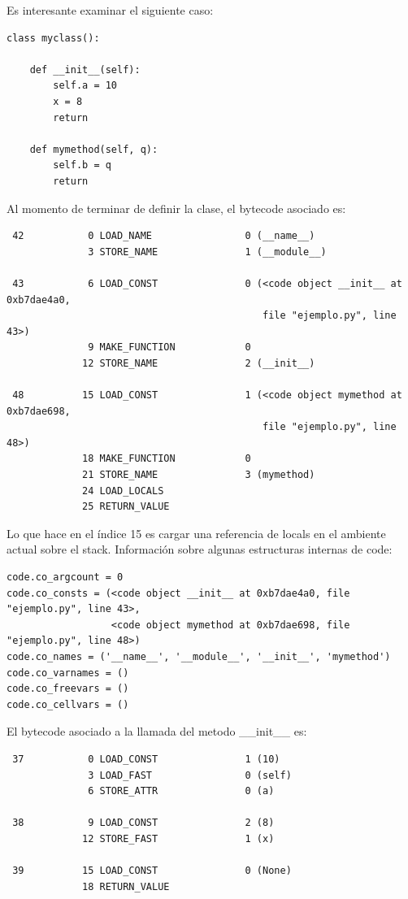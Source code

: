 \documentclass[10pt,a4paper]{article}
\begin{document}
Es interesante examinar el siguiente caso:

\begin{verbatim}
class myclass():

    def __init__(self):
        self.a = 10
        x = 8
        return

    def mymethod(self, q):
        self.b = q
        return
\end{verbatim}

Al momento de terminar de definir la clase, el bytecode asociado es:

\begin{verbatim}
 42           0 LOAD_NAME                0 (__name__)
              3 STORE_NAME               1 (__module__)

 43           6 LOAD_CONST               0 (<code object __init__ at 0xb7dae4a0, 
                                            file "ejemplo.py", line 43>)
              9 MAKE_FUNCTION            0
             12 STORE_NAME               2 (__init__)

 48          15 LOAD_CONST               1 (<code object mymethod at 0xb7dae698, 
                                            file "ejemplo.py", line 48>)
             18 MAKE_FUNCTION            0
             21 STORE_NAME               3 (mymethod)
             24 LOAD_LOCALS         
             25 RETURN_VALUE 

\end{verbatim}

Lo que hace en el índice 15 es cargar una referencia de locals en el ambiente actual sobre el stack.  Información sobre algunas estructuras internas de code:

\begin{verbatim}
code.co_argcount = 0
code.co_consts = (<code object __init__ at 0xb7dae4a0, file "ejemplo.py", line 43>,
                  <code object mymethod at 0xb7dae698, file "ejemplo.py", line 48>)
code.co_names = ('__name__', '__module__', '__init__', 'mymethod')
code.co_varnames = ()
code.co_freevars = ()
code.co_cellvars = ()
\end{verbatim}

El bytecode asociado a la llamada del metodo \_\_init\_\_ es:

\begin{verbatim}
 37           0 LOAD_CONST               1 (10)
              3 LOAD_FAST                0 (self)
              6 STORE_ATTR               0 (a)

 38           9 LOAD_CONST               2 (8)
             12 STORE_FAST               1 (x)

 39          15 LOAD_CONST               0 (None)
             18 RETURN_VALUE        

\end{verbatim}
\end{document}
